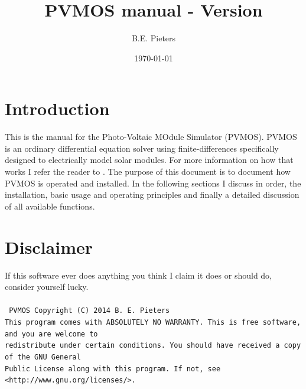 \documentclass[noshowpacs,preprintnumbers,amsmath,amssymb, letter]{revtex4}
\begin{document}
\title{PVMOS manual - Version \version}

\author{B.E. Pieters}%
\date{\today}
\maketitle

\section{Introduction}
This is the manual for the Photo-Voltaic MOdule Simulator (PVMOS). PVMOS is an ordinary differential equation solver using finite-differences specifically designed to electrically model solar modules. For more information on how that works I refer the reader to \cite{pvmos:2014}. The purpose of this document is to document how PVMOS is operated and installed. In the following sections I discuss in order, the installation, basic usage and operating principles and finally a detailed discussion of all available functions.

\section{Disclaimer}
If this software ever does anything you think I claim it does or should do, consider yourself lucky.\\ \\
\texttt{
PVMOS  Copyright (C) 2014  B. E. Pieters\\
This program comes with ABSOLUTELY NO WARRANTY. This is free software, and you are welcome to\\
redistribute under certain conditions. You should have received a copy of the GNU General \\
Public License along with this program. If not, see <http://www.gnu.org/licenses/>.\\
}\\
\end{document}
